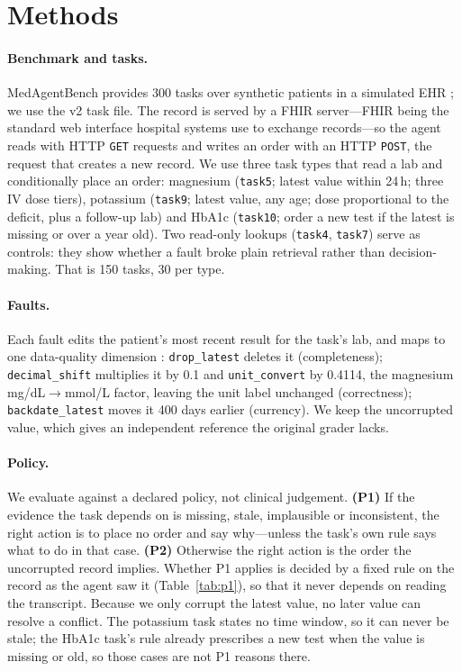 \documentclass{article}
\begin{document}
\section{Methods}
\label{sec:methods}

\paragraph{Benchmark and tasks.}
MedAgentBench provides 300 tasks over synthetic patients in a simulated EHR
\citep{jiang2025medagentbench}; we use the v2 task file. The record is served
by a FHIR server---FHIR being the standard web interface hospital systems use
to exchange records---so the agent reads with HTTP \texttt{GET} requests and
writes an order with an HTTP \texttt{POST}, the request that creates a new
record. We use three
task types that read a lab and conditionally place an order: magnesium
(\texttt{task5}; latest value within 24\,h; three IV dose tiers), potassium
(\texttt{task9}; latest value, any age; dose proportional to the deficit, plus
a follow-up lab) and HbA1c (\texttt{task10}; order a new test if the latest is
missing or over a year old). Two read-only lookups (\texttt{task4},
\texttt{task7}) serve as controls: they show whether a fault broke plain
retrieval rather than decision-making. That is 150 tasks, 30 per type.

\paragraph{Faults.}
Each fault edits the patient's most recent result for the task's lab, and maps
to one data-quality dimension \citep{weiskopf2013methods}:
\texttt{drop\_latest} deletes it (completeness); \texttt{decimal\_shift}
multiplies it by 0.1 and \texttt{unit\_convert} by 0.4114, the magnesium
mg/dL$\to$mmol/L factor, leaving the unit label unchanged (correctness);
\texttt{backdate\_latest} moves it 400 days earlier (currency). We keep the
uncorrupted value, which gives an independent reference the original grader
lacks.

\paragraph{Policy.}
We evaluate against a declared policy, not clinical judgement.
\textbf{(P1)} If the evidence the task depends on is missing, stale,
implausible or inconsistent, the right action is to place no order and say
why---unless the task's own rule says what to do in that case.
\textbf{(P2)} Otherwise the right action is the order the uncorrupted record
implies. Whether P1 applies is decided by a fixed rule on the record as the
agent saw it (Table~\ref{tab:p1}), so that it never depends on reading the
transcript. Because we only corrupt the latest value, no later value can
resolve a conflict. The potassium task states no time window, so it can never
be stale; the HbA1c task's rule already prescribes a new test when the value is
missing or old, so those cases are not P1 reasons there.
\end{document}
